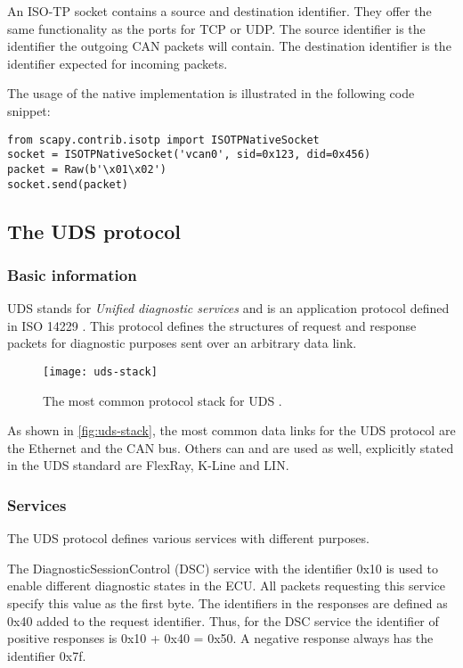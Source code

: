 An ISO-TP socket contains a source and destination identifier. They offer the same functionality as the ports for TCP or UDP. The source identifier is the identifier the outgoing CAN packets will contain. The destination identifier is the identifier expected for incoming packets.

The usage of the native implementation is illustrated in the following code snippet:

\begin{samepage}
\begin{verbatim}
from scapy.contrib.isotp import ISOTPNativeSocket
socket = ISOTPNativeSocket('vcan0', sid=0x123, did=0x456)
packet = Raw(b'\x01\x02')
socket.send(packet)
\end{verbatim}
\end{samepage}

\subsection{The UDS protocol}

\subsubsection{Basic information}

UDS stands for \emph{Unified diagnostic services} and is an application protocol defined in ISO 14229 \cite{iso14229}. This protocol defines the structures of request and response packets for diagnostic purposes sent over an arbitrary data link.

\begin{figure}[h]
    \centering
    \texttt{[image: uds-stack]}
    \caption{The most common protocol stack for UDS \cite{Weiss2020}.}
    \label{fig:uds-stack}
\end{figure}

As shown in \autoref{fig:uds-stack}, the most common data links for the UDS protocol are the Ethernet and the CAN bus. Others can and are used as well, explicitly stated in the UDS standard are FlexRay, K-Line and LIN.

\subsubsection{Services}

The UDS protocol defines various services with different purposes.

The DiagnosticSessionControl (DSC) service with the identifier 0x10 is used to enable different diagnostic states in the ECU. All packets requesting this service specify this value as the first byte. The identifiers in the responses are defined as 0x40 added to the request identifier. Thus, for the DSC service the identifier of positive responses is 0x10 + 0x40 = 0x50. A negative response always has the identifier 0x7f.

